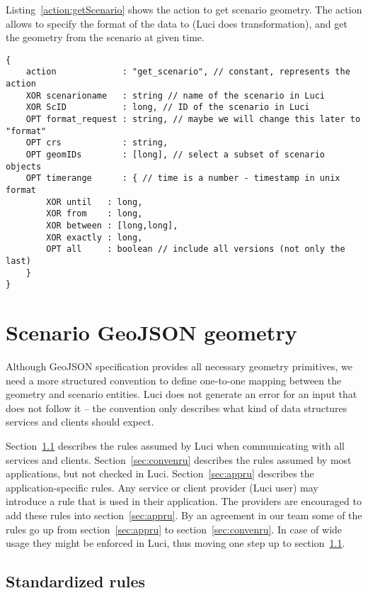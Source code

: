 \documentclass[pdftex,11pt,a4paper]{article} %
\begin{document}
Listing~\ref{action:getScenario} shows the action to get scenario geometry.
The action allows to specify the format of the data to (\ac{Luci} does transformation),
and get the geometry from the scenario at given time.
\begin{lstlisting}[caption={JSON action structure for getting a scenario from \ac{Luci}}, label={action:getScenario}]
{
	action             : "get_scenario", // constant, represents the action
	XOR scenarioname   : string // name of the scenario in Luci
	XOR ScID           : long, // ID of the scenario in Luci
	OPT format_request : string, // maybe we will change this later to "format"
	OPT crs            : string,
	OPT geomIDs        : [long], // select a subset of scenario objects
	OPT timerange      : { // time is a number - timestamp in unix format
		XOR until   : long,
		XOR from    : long,
		XOR between : [long,long],
		XOR exactly : long,
		OPT all     : boolean // include all versions (not only the last)
	}
}
\end{lstlisting}

\section{Scenario GeoJSON geometry}
\label{sec:scenario}

Although GeoJSON specification provides all necessary geometry primitives,
we need a more structured convention to define one-to-one mapping between the geometry and scenario entities.
\ac{Luci} does not generate an error for an input that does not follow it -- the convention only describes what kind of data structures services and clients should expect.

Section~\ref{sec:standardru} describes the rules assumed by \ac{Luci} when communicating with all services and clients.
Section~\ref{sec:convenru} describes the rules assumed by most applications, but not checked in \ac{Luci}.
Section~\ref{sec:appru} describes the application-specific rules.
Any service or client provider (\ac{Luci} user) may introduce a rule that is used in their application.
The providers are encouraged to add these rules into section~\ref{sec:appru}.
By an agreement in our team some of the rules go up from section~\ref{sec:appru} to section~\ref{sec:convenru}.
In case of wide usage they might be enforced in \ac{Luci}, thus moving one step up to section~\ref{sec:standardru}.

\subsection{Standardized rules}
\label{sec:standardru}
\end{document}
